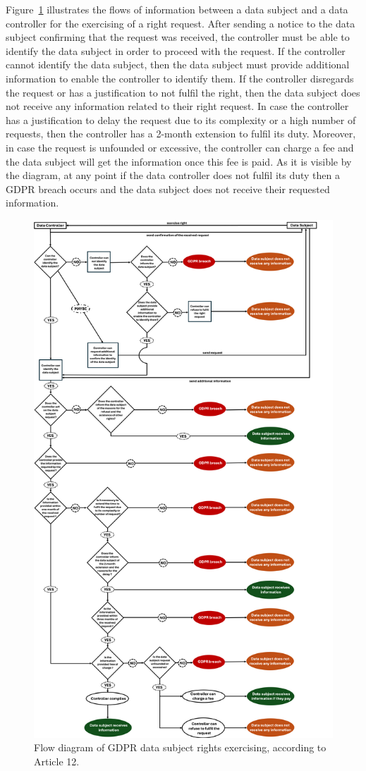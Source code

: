 Figure~\ref{fig:gdpr-rights} illustrates the flows of information between a data subject and a data controller for the exercising of a right request.
After sending a notice to the data subject confirming that the request was received, the controller must be able to identify the data subject in order to proceed with the request.
If the controller cannot identify the data subject, then the data subject must provide additional information to enable the controller to identify them.
If the controller disregards the request or has a justification to not fulfil the right, then the data subject does not receive any information related to their right request.
In case the controller has a justification to delay the request due to its complexity or a high number of requests, then the controller has a 2-month extension to fulfil its duty.
Moreover, in case the request is unfounded or excessive, the controller can charge a fee and the data subject will get the information once this fee is paid.
As it is visible by the diagram, at any point if the data controller does not fulfil its duty then a GDPR breach occurs and the data subject does not receive their requested information.

\begin{figure}[htp]
    \centering
    \includegraphics[width=0.78\linewidth]{figures/chapter-4/GDPR-DSR.png}
    \caption{Flow diagram of GDPR data subject rights exercising, according to Article 12.}
    \label{fig:gdpr-rights}
\end{figure}

